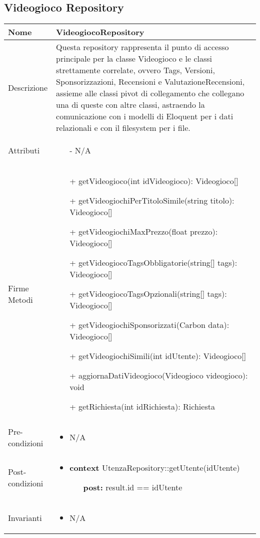 \subsection{Videogioco Repository}
\small\begin{tabular}{|| l | p{34em} ||} 
	\hline
	Nome & VideogiocoRepository\\
	\hline
	Descrizione & Questa repository rappresenta il punto di accesso principale per la classe Videogioco e le classi strettamente correlate, ovvero Tags, Versioni, Sponsorizzazioni, Recensioni e ValutazioneRecensioni, assieme alle classi pivot di collegamento che collegano una di queste con altre classi, astraendo la comunicazione con i modelli di Eloquent per i dati relazionali e con il filesystem per i file.\\
	\hline
	Attributi & \begin{itemize}
		\item[-] N/A
	\end{itemize}\\
	\hline
	Firme Metodi & \begin{itemize}
		\item[+] getVideogioco(int idVideogioco): Videogioco[]
		\item[+] getVideogiochiPerTitoloSimile(string titolo): Videogioco[]
		\item[+] getVideogiochiMaxPrezzo(float prezzo): Videogioco[]
		\item[+] getVideogiocoTagsObbligatorie(string[] tags): Videogioco[]
		\item[+] getVideogiocoTagsOpzionali(string[] tags): Videogioco[]
		\item[+] getVideogiochiSponsorizzati(Carbon data): Videogioco[]
		\item[+] getVideogiochiSimili(int idUtente): Videogioco[]
		\item[+] aggiornaDatiVideogioco(Videogioco videogioco): void
		\item[+] getRichiesta(int idRichiesta): Richiesta  
	\end{itemize}\\
	\hline
Pre-condizioni & \begin{itemize}[leftmargin=*]
	\item N/A
\end{itemize}\\
\hline
Post-condizioni & \begin{itemize}[leftmargin=*]
	\item \textbf{context} UtenzaRepository::getUtente(idUtente)
	\begin{itemize}
		\item[ ] \textbf{post:} result.id == idUtente
	\end{itemize}
\end{itemize}\\
\hline
Invarianti & \begin{itemize}
	\item N/A
\end{itemize}\\
\hline
\end{tabular}